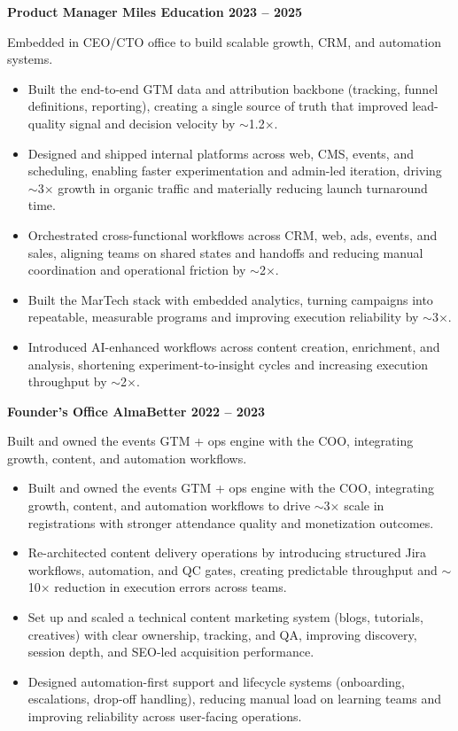 \documentclass[10pt,a4paper]{article}
\begin{document}
\textbf{Product Manager \textbar{} Miles Education \textbar{} 2023 -- 2025}

Embedded in CEO/CTO office to build scalable growth, CRM, and automation systems.
\begin{itemize}
  \item Built the end-to-end GTM data and attribution backbone (tracking, funnel definitions, reporting), creating a single source of truth that improved lead-quality signal and decision velocity by $\sim$1.2$\times$.
  \item Designed and shipped internal platforms across web, CMS, events, and scheduling, enabling faster experimentation and admin-led iteration, driving $\sim$3$\times$ growth in organic traffic and materially reducing launch turnaround time.
  \item Orchestrated cross-functional workflows across CRM, web, ads, events, and sales, aligning teams on shared states and handoffs and reducing manual coordination and operational friction by $\sim$2$\times$.
  \item Built the MarTech stack with embedded analytics, turning campaigns into repeatable, measurable programs and improving execution reliability by $\sim$3$\times$.
  \item Introduced AI-enhanced workflows across content creation, enrichment, and analysis, shortening experiment-to-insight cycles and increasing execution throughput by $\sim$2$\times$.
\end{itemize}

\textbf{Founder's Office \textbar{} AlmaBetter \textbar{} 2022 -- 2023}

Built and owned the events GTM + ops engine with the COO, integrating growth, content, and automation workflows.
\begin{itemize}
  \item Built and owned the events GTM + ops engine with the COO, integrating growth, content, and automation workflows to drive $\sim$3$\times$ scale in registrations with stronger attendance quality and monetization outcomes.
  \item Re-architected content delivery operations by introducing structured Jira workflows, automation, and QC gates, creating predictable throughput and $\sim$10$\times$ reduction in execution errors across teams.
  \item Set up and scaled a technical content marketing system (blogs, tutorials, creatives) with clear ownership, tracking, and QA, improving discovery, session depth, and SEO-led acquisition performance.
  \item Designed automation-first support and lifecycle systems (onboarding, escalations, drop-off handling), reducing manual load on learning teams and improving reliability across user-facing operations.
\end{itemize}
\end{document}
